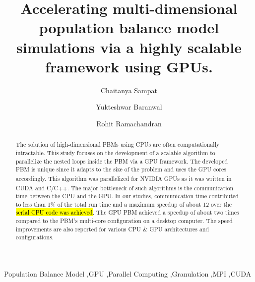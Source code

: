 \documentclass[review]{elsarticle}
\begin{document}
\begin{frontmatter}
\title{Accelerating multi-dimensional population balance model simulations via a highly 
scalable framework using GPUs.}


\author[label1]{Chaitanya Sampat}
\author[label1]{Yukteshwar Baranwal}
\address[label1]{Chemical and Biochemical Engineering, 
Rutgers University, Piscataway, NJ, USA - 08854}
\author[label1]{Rohit Ramachandran}

\begin{abstract}
The solution of high-dimensional PBMs using CPUs are often 
computationally intractable. This study focuses on the development of a scalable 
algorithm to parallelize the nested loops inside the PBM via a GPU framework. 
The developed PBM is unique since it adapts  to the size of the problem and uses 
the GPU cores accordingly. This algorithm was parallelized for
 NVIDIA\textsuperscript{\tiny\textregistered} GPUs as it was written in 
 CUDA\textsuperscript{\tiny\textregistered} and C/C++. The major 
bottleneck of such algorithms is the communication time between the CPU and the GPU. 
In our studies, communication time contributed to less than 1\% of the total run 
time and a maximum speedup of about 12 over the \hl{serial CPU code was achieved}. 
The GPU PBM achieved a speedup of about two times compared to the PBM's
multi-core configuration on a desktop computer. The speed improvements are also 
reported for various CPU \& GPU architectures and configurations.

\end{abstract}

\begin{keyword}
Population Balance Model \sep GPU \sep Parallel Computing \sep Granulation \sep MPI \sep CUDA
\end{keyword}

\end{frontmatter}
\end{document}
